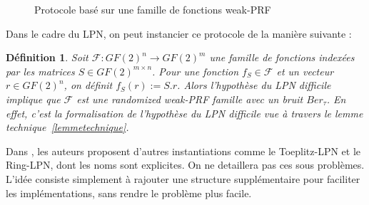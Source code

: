 \documentclass{article}		%
\newtheorem{defi}{Définition}
\theoremstyle{definition}
\theoremstyle{plain}
\theoremstyle{plain}
\theoremstyle{plain}
\theoremstyle{plain}
\theoremstyle{plain}
\begin{document}
\begin{figure}[h]
\centering
{}
\caption{Protocole basé sur une famille de fonctions weak-PRF}
\label{protmitm}
\end{figure}

Dans le cadre du LPN, on peut instancier ce protocole de la manière
suivante :

\begin{defi}
Soit $\mathcal{F}: GF(2)^n\rightarrow GF(2)^m$ une famille de fonctions
indexées par les matrices $S\in GF(2)^{m\times n}$. Pour une fonction
$f_S\in\mathcal{F}$ et un vecteur $r\in GF(2)^n$, on définit $f_S(r):=
S.r$. Alors l'hypothèse du LPN difficile implique que $\mathcal{F}$ est
une \emph{randomized weak-PRF} famille avec un bruit $Ber_\tau$. En
effet, c'est la formalisation de l'hypothèse du LPN difficile vue à
travers le \emph{lemme technique}~\ref{lemmetechnique}.
\end{defi}

Dans \cite{Lyu}, les auteurs proposent d'autres instantiations comme le
Toeplitz-LPN et le Ring-LPN, dont les noms sont explicites. On ne detaillera pas ces sous problèmes.
L'idée consiste simplement à rajouter une structure supplémentaire pour
faciliter les implémentations, sans rendre le problème plus facile.
\end{document}
